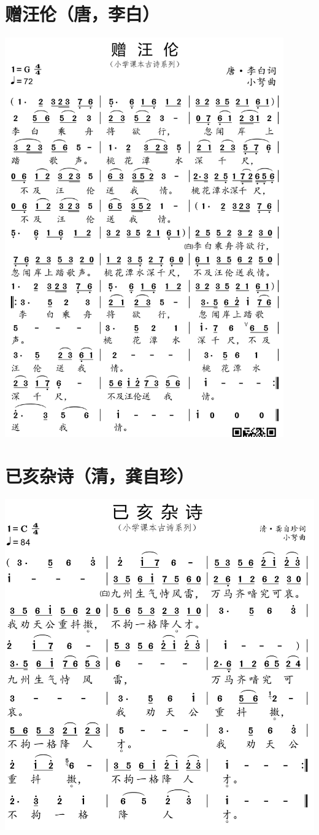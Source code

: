 \documentclass[cn,pad,twocol]{elegantbook}
\begin{document}
\section{赠汪伦（唐，李白）}
    \includegraphics[width=0.9\textwidth]{dongxiao/20200627-古诗-赠汪伦.jpg}   
\section{已亥杂诗（清，龚自珍）}
    \includegraphics[width=\textwidth]{dongxiao/20200627-古诗-龚自珍-已亥杂诗.jpg}   
\end{document}
